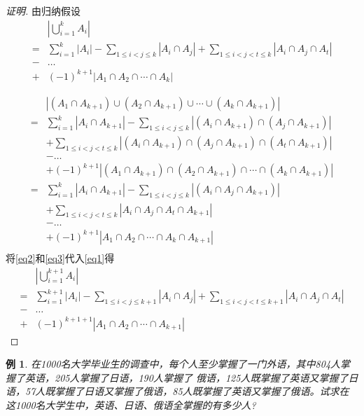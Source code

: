 \documentclass{book}[oneside]
\newtheorem*{Example}{例}
\begin{document}
\begin{CJK*}{UTF8}{gbsn}
\begin{proof}[证明]
    由归纳假设
  \begin{equation}\label{eq2}
\begin{split}
    &|\bigcup_{i=1}^kA_i|\\
=&\sum_{i=1}^k|A_i| - \sum_{1\leq i < j \leq k}|A_i \cap A_j| + \sum_{1 \leq  i < j < t \leq k}|A_i \cap A_j \cap A_t|\\
-&\ldots\\
+&(-1)^{k+1}|A_1 \cap A_2 \cap \cdots \cap A_k| 
  \end{split}
\end{equation}

  \begin{equation}\label{eq3}
    \begin{split}
      &|(A_1 \cap A_{k+1}) \cup (A_2 \cap A_{k+1}) \cup \cdots \cup (A_k \cap A_{k+1})|\\
      =&\sum_{i=1}^k|A_i \cap A_{k+1}| - \sum_{1\leq i < j \leq k}|(A_i \cap A_{k+1}) \cap (A_j \cap A_{k+1}) |\\
      &+ \sum_{1 \leq  i < j < t \leq k}|(A_i \cap A_{k+1}) \cap (A_j \cap A_{k+1}) \cap (A_t \cap A_{k+1})|\\
&-\ldots\\
&+(-1)^{k+1}|(A_1 \cap A_{k+1}) \cap (A_2 \cap A_{k+1}) \cap \cdots \cap (A_k \cap A_{k+1})| \\
      =&\sum_{i=1}^k|A_i \cap A_{k+1}| - \sum_{1\leq i < j \leq k}|(A_i  \cap A_j \cap A_{k+1}) |\\
      &+ \sum_{1 \leq  i < j < t \leq k}|A_i  \cap A_j  \cap A_t \cap A_{k+1}|\\
&-\ldots\\
&+(-1)^{k+1}|A_1  \cap A_2  \cap \cdots \cap A_k \cap A_{k+1}| \\
    \end{split}
  \end{equation}
    将\eqref{eq2}和\eqref{eq3}代入\eqref{eq1}得
  \begin{equation*}
    \begin{split}
    &|\bigcup_{i=1}^{k+1}A_i|\\
=&\sum_{i=1}^{k+1}|A_i| - \sum_{1\leq i < j \leq {k+1}}|A_i \cap A_j| + \sum_{1 \leq  i < j < t \leq {k+1}}|A_i \cap A_j \cap A_t|\\
-&\ldots\\
+&(-1)^{k+1+1}|A_1 \cap A_2 \cap \cdots \cap A_{k+1}|
\end{split}
\end{equation*}


\end{proof}
\begin{Example}
  在1000名大学毕业生的调查中，每个人至少掌握了一门外语，其中804人掌握了英语，205人掌握了日语，190人掌握了 俄语，125人既掌握了英语又掌握了日语，57人既掌握了日语又掌握了俄语，85人既掌握了英语又掌握了俄语。试求在这1000名大学生中，英语、日语、俄语全掌握的有多少人?
\end{Example}


\end{CJK*}
\end{document}
